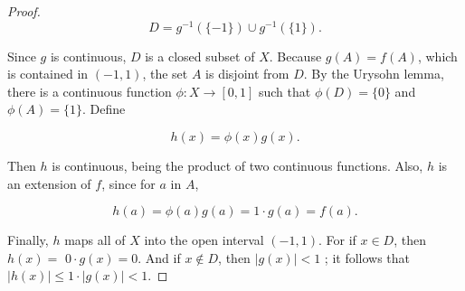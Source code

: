 \begin{proof}
\[
D = g^{-1}( {\{ - 1\} }) \cup {g}^{-1}( {\{ 1\} }).
\]

Since \(g\) is continuous, \(D\) is a closed subset of \(X\). Because \(g( A) = f( A)\), which is contained in \((-1,1)\), the set \(A\) is disjoint from \(D\). By the Urysohn lemma, there is a continuous function \(\phi : X \rightarrow [ {0,1}]\) such that \(\phi ( D) = \{ 0\}\) and \(\phi ( A) = \{ 1\}\). Define

\[
h(x) = \phi (x) g(x).
\]

Then \(h\) is continuous, being the product of two continuous functions. Also, \(h\) is an extension of \(f\), since for \(a\) in \(A\),

\[
h( a) = \phi ( a) g( a) = 1 \cdot g( a) = f( a).
\]

Finally, \(h\) maps all of \(X\) into the open interval \((-1,1)\). For if \(x \in D\), then \(h(x) =\) \(0 \cdot g(x) = 0\). And if \(x \notin D\), then \(| {g(x) }| < 1\) ; it follows that \(| {h(x) }| \leq 1 \cdot | {g(x) }| < 1\).
\end{proof}

